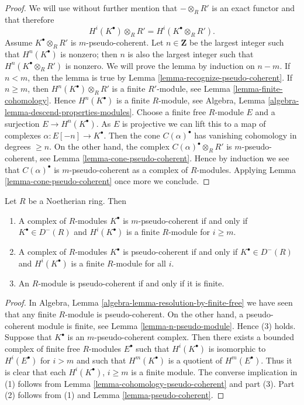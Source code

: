 \begin{proof}
We will use without further mention that $- \otimes_R R'$ is
an exact functor and that therefore
$$
H^i(K^\bullet) \otimes_R R' = H^i(K^\bullet \otimes_R R').
$$
Assume $K^\bullet \otimes_R R'$ is $m$-pseudo-coherent.
Let $n \in \mathbf{Z}$ be the largest integer such that
$H^n(K^\bullet)$ is nonzero; then $n$ is also the largest integer
such that $H^n(K^\bullet \otimes_R R')$ is nonzero.
We will prove the lemma by induction on $n - m$.
If $n < m$, then the lemma is true by
Lemma \ref{lemma-recognize-pseudo-coherent}.
If $n \geq m$, then $H^n(K^\bullet) \otimes_R R'$ is a finite
$R'$-module, see
Lemma \ref{lemma-finite-cohomology}.
Hence $H^n(K^\bullet)$ is a finite $R$-module, see
Algebra, Lemma \ref{algebra-lemma-descend-properties-modules}.
Choose a finite free $R$-module $E$ and a surjection $E \to H^n(K^\bullet)$.
As $E$ is projective we can lift this to a map of complexes
$\alpha : E[-n] \to K^\bullet$. Then the cone $C(\alpha)^\bullet$ has
vanishing cohomology in degrees $\geq n$. On the other hand, the
complex $C(\alpha)^\bullet \otimes_R R'$ is $m$-pseudo-coherent, see
Lemma \ref{lemma-cone-pseudo-coherent}.
Hence by induction we see that $C(\alpha)^\bullet$ is $m$-pseudo-coherent
as a complex of $R$-modules. Applying
Lemma \ref{lemma-cone-pseudo-coherent}
once more we conclude.
\end{proof}

\begin{lemma}
\label{lemma-Noetherian-pseudo-coherent}
Let $R$ be a Noetherian ring. Then
\begin{enumerate}
\item A complex of $R$-modules $K^\bullet$ is $m$-pseudo-coherent
if and only if $K^\bullet \in D^{-}(R)$ and
$H^i(K^\bullet)$ is a finite $R$-module for $i \geq m$.
\item A complex of $R$-modules $K^\bullet$ is pseudo-coherent
if and only if $K^\bullet \in D^{-}(R)$ and
$H^i(K^\bullet)$ is a finite $R$-module for all $i$.
\item An $R$-module is pseudo-coherent if and only if it is finite.
\end{enumerate}
\end{lemma}

\begin{proof}
In
Algebra, Lemma \ref{algebra-lemma-resolution-by-finite-free}
we have seen that any finite $R$-module is pseudo-coherent.
On the other hand, a pseudo-coherent module is finite, see
Lemma \ref{lemma-n-pseudo-module}.
Hence (3) holds. Suppose that $K^\bullet$ is an $m$-pseudo-coherent complex.
Then there exists a bounded complex of finite free $R$-modules $E^\bullet$
such that $H^i(K^\bullet)$ is isomorphic to $H^i(E^\bullet)$ for
$i > m$ and such that $H^m(K^\bullet)$ is a quotient of $H^m(E^\bullet)$.
Thus it is clear that each $H^i(K^\bullet)$, $i \geq m$ is a finite module.
The converse implication in (1) follows from
Lemma \ref{lemma-cohomology-pseudo-coherent}
and part (3).
Part (2) follows from (1) and
Lemma \ref{lemma-pseudo-coherent}.
\end{proof}








